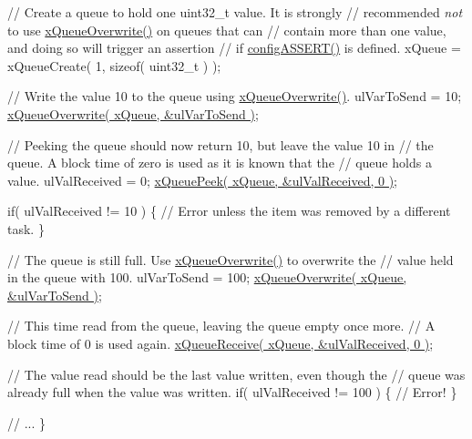 \begin{DoxyPre}    // Create a queue to hold one uint32\_t value.  It is strongly
    // recommended {\itshape not} to use \hyperlink{queue_8h_a8e9ced123b5a0e37a36d3bbdb2e56b4e}{xQueueOverwrite()} on queues that can
    // contain more than one value, and doing so will trigger an assertion
    // if \hyperlink{FreeRTOS_8h_a228c70cd48927d6ab730ed1a6dfbe35f}{configASSERT()} is defined.
    xQueue = xQueueCreate( 1, sizeof( uint32\_t ) );\end{DoxyPre}



\begin{DoxyPre}    // Write the value 10 to the queue using \hyperlink{queue_8h_a8e9ced123b5a0e37a36d3bbdb2e56b4e}{xQueueOverwrite()}.
    ulVarToSend = 10;
    \hyperlink{queue_8h_a8e9ced123b5a0e37a36d3bbdb2e56b4e}{xQueueOverwrite( xQueue, &ulVarToSend )};\end{DoxyPre}



\begin{DoxyPre}    // Peeking the queue should now return 10, but leave the value 10 in
    // the queue.  A block time of zero is used as it is known that the
    // queue holds a value.
    ulValReceived = 0;
    \hyperlink{queue_8h_a2df70733bb875477cd9614c5b3446257}{xQueuePeek( xQueue, &ulValReceived, 0 )};\end{DoxyPre}



\begin{DoxyPre}    if( ulValReceived != 10 )
    \{
        // Error unless the item was removed by a different task.
    \}\end{DoxyPre}



\begin{DoxyPre}    // The queue is still full.  Use \hyperlink{queue_8h_a8e9ced123b5a0e37a36d3bbdb2e56b4e}{xQueueOverwrite()} to overwrite the
    // value held in the queue with 100.
    ulVarToSend = 100;
    \hyperlink{queue_8h_a8e9ced123b5a0e37a36d3bbdb2e56b4e}{xQueueOverwrite( xQueue, &ulVarToSend )};\end{DoxyPre}



\begin{DoxyPre}    // This time read from the queue, leaving the queue empty once more.
    // A block time of 0 is used again.
    \hyperlink{queue_8h_af1549eac0e7f05694a59a0b967c80be3}{xQueueReceive( xQueue, &ulValReceived, 0 )};\end{DoxyPre}



\begin{DoxyPre}    // The value read should be the last value written, even though the
    // queue was already full when the value was written.
    if( ulValReceived != 100 )
    \{
        // Error!
    \}\end{DoxyPre}



\begin{DoxyPre}    // ...
\}
 \end{DoxyPre}
 